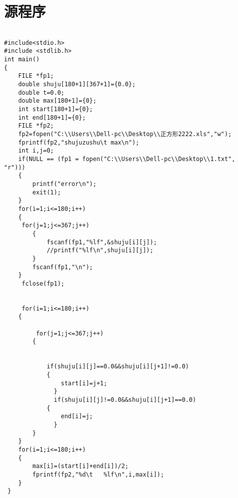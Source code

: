 

\chapter*{源程序}
\lstset{language=C}
\begin{lstlisting}

#include<stdio.h>
#include <stdlib.h>
int main()
{
	FILE *fp1;
	double shuju[180+1][367+1]={0.0};
	double t=0.0;
	double max[180+1]={0};
	int start[180+1]={0};
	int end[180+1]={0};
	FILE *fp2;
	fp2=fopen("C:\\Users\\Dell-pc\\Desktop\\正方形2222.xls","w");
	fprintf(fp2,"shujuzushu\t max\n");
	int i,j=0;
	if(NULL == (fp1 = fopen("C:\\Users\\Dell-pc\\Desktop\\1.txt", "r")))  
    {  
        printf("error\n");  
        exit(1);  
    }
    for(i=1;i<=180;i++)
	{
	 for(j=1;j<=367;j++)
		{
			fscanf(fp1,"%lf",&shuju[i][j]);
			//printf("%lf\n",shuju[i][j]);
		}
		fscanf(fp1,"\n");
	}
	 fclose(fp1);
	
	
	 for(i=1;i<=180;i++)
	{
	
		 for(j=1;j<=367;j++)
		{
			
			
			if(shuju[i][j]==0.0&&shuju[i][j+1]!=0.0)
			{
				start[i]=j+1;
			  }
			  if(shuju[i][j]!=0.0&&shuju[i][j+1]==0.0)
			{
				end[i]=j;
			  }
		}
	}
	for(i=1;i<=180;i++)
	{
		max[i]=(start[i]+end[i])/2;
		fprintf(fp2,"%d\t   %lf\n",i,max[i]);
	}
 }
\end{lstlisting}